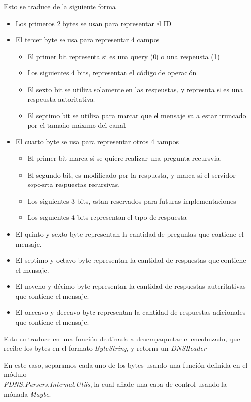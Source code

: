 \documentclass[6pt]{article}
\begin{document}
Esto se traduce de la siguiente forma
\begin{itemize}
  \item Los primeros 2 bytes se usan para representar el ID
  \item El tercer byte se usa para representar 4 campos
  \begin{itemize}
    \item El primer bit representa si es una query (0) o una respeusta (1)
    \item Los siguientes 4 bits, representan el código de operación
    \item El sexto bit se utiliza solamente en las respeustas,
    y represnta si es una respeusta autoritativa.
    \item El septimo bit se utiliza para marcar que el mensaje va
    a estar truncado por el tamaño máximo del canal.
  \end{itemize}
  \item El cuarto byte se usa para representar otros 4 campos
  \begin{itemize}
    \item El primer bit marca si se quiere realizar una pregunta
    recursvia.
    \item El segundo bit, es modificado por la respuesta, y marca si
    el servidor sopoerta respuestas recursivas.
    \item Los siguientes 3 bits, estan reservados para futuras
    implementaciones
    \item Los siguientes 4 bits representan el tipo de respuesta
  \end{itemize}
  \item El quinto y sexto byte representan la cantidad de preguntas
  que contiene el mensaje.
  \item El septimo y octavo byte representan la cantidad de respuestas
  que contiene el mensaje.
  \item El noveno y décimo byte representan la cantidad de respuestas
  autoritativas que contiene el mensaje.
  \item El onceavo y doceavo byte representan la cantidad de respuestas
  adicionales que contiene el mensaje.
\end{itemize}

Esto se traduce en una función destinada a desempaquetar el encabezado,
que recibe los bytes en el formato \textit{ByteString}, y retorna un
\textit{DNSHeader}

En este caso, separamos cada uno de los bytes usando una función
definida en el módulo \\\textit{FDNS.Parsers.Internal.Utils}, la
cual añade una capa de control usando la mónada \textit{Maybe}.
\end{document}
